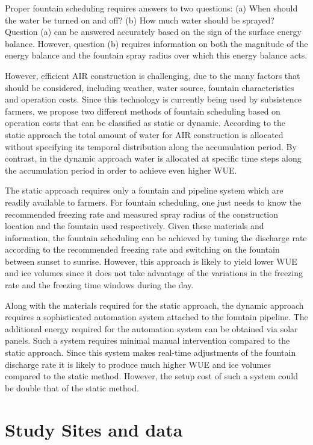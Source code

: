 \documentclass[utf8]{frontiersSCNS}
\begin{document}
Proper fountain scheduling requires answers to two questions: (a) When should the water be turned on and off?
(b) How much water should be sprayed? Question (a) can be answered accurately based on the sign of the surface
energy balance. However, question (b) requires information on both the magnitude of the energy balance and the
fountain spray radius over which this energy balance acts.  

However, efficient AIR construction is challenging, due to the many factors that should be considered, including
weather, water source, fountain characteristics and operation costs. Since this technology is currently being
used by subsistence farmers, we propose two different methods of fountain scheduling based on operation costs
that can be classified as static or dynamic. According to the static approach the total amount of water for AIR
construction is allocated without specifying its temporal distribution along the accumulation period. By
contrast, in the dynamic approach water is allocated at specific time steps along the accumulation period in
order to achieve even higher WUE.

The static approach requires only a fountain and pipeline system which are readily available to farmers. For
fountain scheduling, one just needs to know the recommended freezing rate and measured spray radius of the
construction location and the fountain used respectively. Given these materials and information, the fountain
scheduling can be achieved by tuning the discharge rate according to the recommended freezing rate and switching
on the fountain between sunset to sunrise. However, this approach is likely to yield lower WUE and ice volumes
since it does not take advantage of the variations in the freezing rate and the freezing time windows during the
day.

Along with the materials required for the static approach, the dynamic approach requires a sophisticated
automation system attached to the fountain pipeline. The additional energy required for the automation system
can be obtained via solar panels. Such a system requires minimal manual intervention compared to the static
approach. Since this system makes real-time adjustments of the fountain discharge rate it is likely to produce
much higher WUE and ice volumes compared to the static method. However, the setup cost of such a system could be
double that of the static method.

\section{Study Sites and data}
\end{document}
